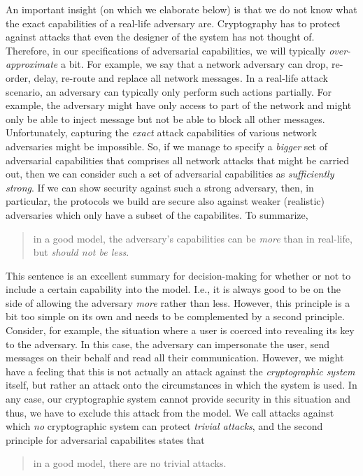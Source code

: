 An important insight (on which we elaborate below) is that we do not know what the exact capabilities of a real-life adversary are.
Cryptography has to protect against attacks that even the designer of the system has not thought of.
Therefore, in our specifications of adversarial capabilities, we will typically \emph{over-approximate} a bit.
For example, we say that a network adversary can drop, re-order, delay, re-route and replace all network messages.
In a real-life attack scenario, an adversary can typically only perform such actions partially.
For example, the adversary might have only access to part of the network and might only be able to inject message but not be able to block all other messages.
Unfortunately, capturing the \emph{exact} attack capabilities of various network adversaries might
be impossible.
So, if we manage to specify a \emph{bigger} set of adversarial capabilities that comprises all network attacks that might be carried out, then we can consider such a set of adversarial capabilities as \emph{sufficiently strong}.
If we can show security against such a strong adversary, then, in particular, the protocols we build are secure also against weaker (realistic) adversaries which only have a subset of the capabilites. To summarize,
\begin{quote}
    in a good model, the adversary's capabilities can be \emph{more} than in real-life, but \emph{should not be less}.
\end{quote}
This sentence is an excellent summary for decision-making for whether or not to include a certain capability into the model. I.e., it is always good to be on the side of allowing the adversary \emph{more} rather than less. However, this principle is a bit too simple on its own and needs to be complemented by a second principle. Consider, for example, the situation where a user is coerced into revealing its key to the adversary. In this case, the adversary can impersonate the user, send messages on their behalf and read all their communication. However, we might have a feeling that this is not actually an attack against the \emph{cryptographic system} itself, but rather an attack onto the circumstances in which the system is used. In any case, our cryptographic system cannot provide security in this situation and thus, we have to exclude this attack from the model. We call attacks against which \emph{no} cryptographic system can protect \emph{trivial attacks}, and the second principle for adversarial capabilites states that
\begin{quote}
    in a good model, there are no trivial attacks.
\end{quote}


